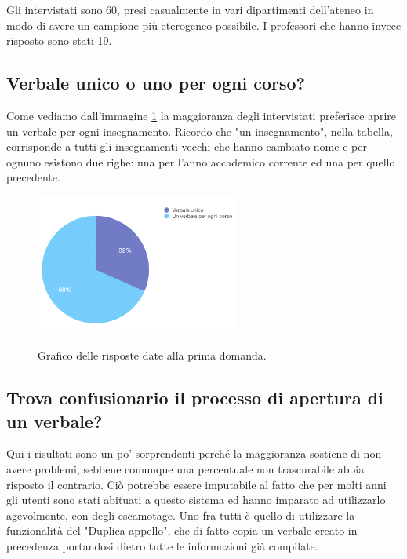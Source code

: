 \documentclass[Lau, oneside, noexaminfo]{sapthesis}%
\begin{document}
Gli intervistati sono 60, presi casualmente in vari dipartimenti dell'ateneo in modo di avere un campione più eterogeneo possibile. I professori che hanno invece risposto sono stati 19.

\subsection{Verbale unico o uno per ogni corso?}

Come vediamo dall'immagine \ref{fig:d-i} la maggioranza degli intervistati preferisce aprire un verbale per ogni insegnamento. Ricordo che "un insegnamento", nella tabella, corrisponde a tutti gli insegnamenti vecchi che hanno cambiato nome e per ognuno esistono due righe: una per l'anno accademico corrente ed una per quello precedente.

\begin{figure}[H]
	\caption{Grafico delle risposte date alla prima domanda.}
	\centering
	\includegraphics[width=0.6\textwidth]{d-i.png}
	\label{fig:d-i}
\end{figure}

\subsection{Trova confusionario il processo di apertura di un verbale?}
Qui i risultati sono un po' sorprendenti perché la maggioranza sostiene di non avere problemi, sebbene comunque una percentuale non trascurabile abbia risposto il contrario. Ciò potrebbe essere imputabile al fatto che per molti anni gli utenti sono stati abituati a questo sistema ed hanno imparato ad utilizzarlo agevolmente, con degli escamotage. Uno fra tutti è quello di utilizzare la funzionalità del "Duplica appello", che di fatto copia un verbale creato in precedenza portandosi dietro tutte le informazioni già compilate.
\end{document}
